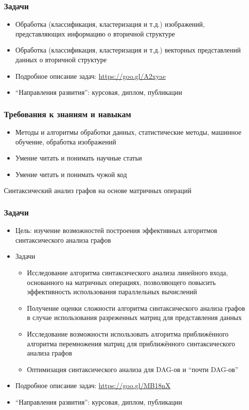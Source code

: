 \documentclass{beamer}
\begin{document}
\begin{frame}[fragile]
\transwipe[direction=90]
\frametitle{Задачи}
\begin{itemize}
\item Обработка (классификация, кластеризация и т.д.) изображений, представляющих информацию о вторичной структуре
\item Обработка (классификация, кластеризация и т.д.) векторных представлений данных о вторичной структуре
\item Подробное описание задач: \url{https://goo.gl/A2xyae}
\item ``Направления развития'': курсовая, диплом, публикации
\end{itemize}
\end{frame}

\begin{frame}
  \transwipe[direction=90]
  \frametitle{Требования к знаниям и навыкам}
  \begin{itemize}
    \item Методы и алгоритмы обработки данных, статистические методы, машинное обучение, обработка изображений
    \item Умение читать и понимать научные статьи
    \item Умение читать и понимать чужой код    
  \end{itemize}
\end{frame}


\begin{frame}[plain,c]
 \transwipe[direction=90]
 \begin{center}
  \Huge Синтаксический анализ графов на основе матричных операций
 \end{center}
\end{frame}

\begin{frame}[fragile]
\transwipe[direction=90]
\frametitle{Задачи}
\begin{itemize}
\item Цель: изучение возможностей построения эффективных алгоритмов синтаксического анализа графов
\item Задачи
\begin{itemize}
\item Исследование алгоритма синтаксического анализа линейного входа, основанного на матричных операциях, позволяющего повысить эффективность использования параллельных вычислений
\item Получение оценки сложности алгоритма синтаксического анализа графов в случае использования разреженных матриц для представления данных
\item Исследование возможности использовать алгоритма приближённого алгоритма перемножения матриц для приближённого синтаксического анализа графов
\item Оптимизация синтаксического анализа для DAG-ов и ``почти DAG-ов''
\end{itemize}
\item Подробное описание задач: \url{https://goo.gl/MB18nX}
\item ``Направления развития'': курсовая, диплом, публикации
\end{itemize}
\end{frame}
\end{document}
